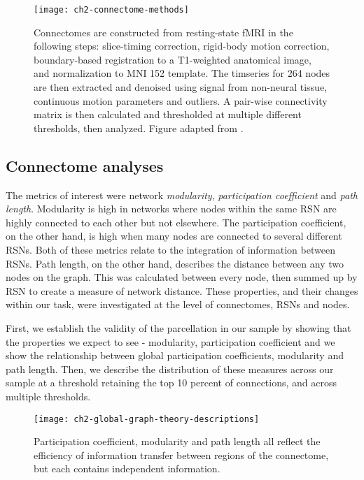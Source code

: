 \begin{figure}[t]
    \centering
    \texttt{[image: ch2-connectome-methods]}
    \caption[Schematic for connectome construction.]{Connectomes are constructed from resting-state fMRI in the following steps: slice-timing correction, rigid-body motion correction, boundary-based registration to a T1-weighted anatomical image, and normalization to MNI 152 template. The timseries for 264 nodes are then extracted and denoised using signal from non-neural tissue, continuous motion parameters and outliers. A pair-wise connectivity matrix is then calculated and thresholded at multiple different thresholds, then analyzed. Figure adapted from \citep{Yang2018}.}
    \label{fig:ch2-connectome-methods}
\end{figure}

\subsection{Connectome analyses}

The metrics of interest were network \textit{modularity}, \textit{participation coefficient} and \textit{path length}. Modularity is high in networks where nodes within the same RSN are highly connected to each other but not elsewhere. The participation coefficient, on the other hand, is high when many nodes are connected to several different RSNs. Both of these metrics relate to the integration of information between RSNs. Path length, on the other hand, describes the distance between any two nodes on the graph. This was calculated between every node, then summed up by RSN to create a measure of network distance. These properties, and their changes within our task, were investigated at the level of connectomes, RSNs and nodes. 

First, we establish the validity of the parcellation in our sample by showing that the properties we expect to see - modularity, participation coefficient and we show the relationship between global participation coefficients, modularity and path length. Then, we describe the distribution of these measures across our sample at a threshold retaining the top 10 percent of connections, and across multiple thresholds. 

\begin{figure}[t]
    \centering
    \texttt{[image: ch2-global-graph-theory-descriptions]}
    \caption[Relationships between global graph theory measures.]{Participation coefficient, modularity and path length all reflect the efficiency of information transfer between regions of the connectome, but each contains independent information.}
    \label{fig:ch2-global-graph-theory-descriptions}
\end{figure}

